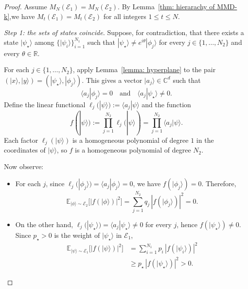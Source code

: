 \documentclass[aps,prx,reprint,superscriptaddress,amsmath,amssymb,longbibliography,floatfix]{revtex4-2}
\newcommand{\Abs}[1]{\left\lvert #1\right\rvert}
\providecommand{\ket}[1]{|#1 \rangle}
\providecommand{\braket}[2]{\langle #1|#2 \rangle}
\newcommand{\dsE}{\mathbb{E}}
\theoremstyle{plain}
\theoremstyle{definition}
\theoremstyle{remark}
\begin{document}
\begin{proof}
Assume $M_N(\mathcal E_1)=M_N(\mathcal E_2)$. By Lemma~\ref{thm: hierarachy of MMD-k},we have $M_t(\mathcal E_1)=M_t(\mathcal E_2)$ for all integers $1\le t\le N$.

\medskip
\noindent\textit{Step 1: the sets of states coincide.}
Suppose, for contradiction, that there exists a state $\ket{\psi_\star}$ among $\{\ket{\psi_i}\}_{i=1}^{N_1}$
such that $\ket{\psi_\star}\neq e^{i\theta}\ket{\phi_j}$ for every $j\in\{1,\dots,N_2\}$ and every $\theta\in\mathbb R$.

For each $j\in\{1,\dots,N_2\}$, apply Lemma~\ref{lemma: hyperplane}
to the pair $(\ket{x},\ket{y})=(\ket{\psi_\star},\ket{\phi_j})$. This gives a vector $\ket{a_j}\in\mathbb C^d$ such that
\[
\braket{a_j}{\phi_j}=0
\quad\text{and}\quad
\braket{a_j}{\psi_\star}\neq 0.
\]
Define the linear functional $\ell_j(\ket{\psi}) := \braket{a_j}{\psi}$ and the function
\begin{equation}
f(\ket{\psi}) := \prod_{j=1}^{N_2} \ell_j(\ket{\psi})
= \prod_{j=1}^{N_2} \braket{a_j}{\psi}.
\label{eq:app-support-separating-polynomial}
\end{equation}
Each factor $\ell_j(\ket{\psi})$ is a homogeneous polynomial of degree $1$ in the coordinates of $\ket{\psi}$,
so $f$ is a homogeneous polynomial of degree $N_2$.

Now observe:
\begin{itemize}
\item For each $j$, since $\ell_j(\ket{\phi_j})=\braket{a_j}{\phi_j}=0$, we have $f(\ket{\phi_j})=0$.
Therefore,
\[ 
\dsE_{\ket{\phi}\sim\mathcal E_2}\!\big[\Abs{f(\ket{\phi})}^2\big]
= \sum_{j=1}^{N_2} q_j\,\Abs{f(\ket{\phi_j})}^2
=0.
\]
\item On the other hand, $\ell_j(\ket{\psi_\star})=\braket{a_j}{\psi_\star}\neq 0$ for every $j$, hence
$f(\ket{\psi_\star})\neq 0$. Since $p_\star>0$ is the weight of $\ket{\psi_\star}$ in $\mathcal E_1$,
\[
\begin{aligned}
\dsE_{\ket{\psi}\sim\mathcal E_1}\!\big[\Abs{f(\ket{\psi})}^2\big]
&= \sum_{i=1}^{N_1} p_i\,\Abs{f(\ket{\psi_i})}^2\\
&\ge p_\star\,\Abs{f(\ket{\psi_\star})}^2
>0.
\end{aligned}
\]
\end{itemize}


\end{proof}
\end{document}

